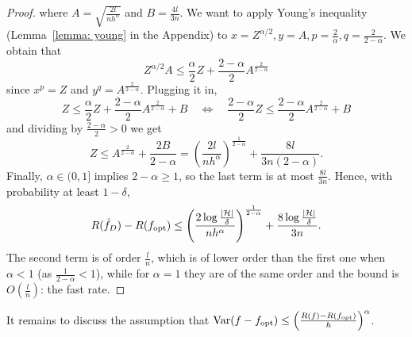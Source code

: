 \documentclass[reqno]{amsart}
\begin{document}
\begin{theorem}
\begin{proof}
        where $A = \sqrt{\frac{2l}{nh^\alpha}}$ and $B = \frac{4l}{3n}$. We want to apply Young's inequality (Lemma~\ref{lemma: young} in the Appendix) to $x = Z^{\alpha/2}, y = A, p = \frac{2}{\alpha}, q = \frac{2}{2-\alpha}$. We obtain that
        \begin{equation}
            Z^{\alpha/2} A \le \frac{\alpha}{2} Z + \frac{2-\alpha}{2} A^{\frac{2}{2-\alpha}}
        \end{equation}
        since $x^p = Z$ and $y^q = A^{\frac{2}{2-\alpha}}$. Plugging it in, 
        \begin{equation}
            Z \le \frac{\alpha}{2} Z + \frac{2-\alpha}{2} A^{\frac{2}{2-\alpha}} + B
            \quad\Longleftrightarrow\quad
            \frac{2-\alpha}{2} Z \le \frac{2-\alpha}{2} A^{\frac{2}{2-\alpha}} + B
        \end{equation}
        and dividing by $\frac{2-\alpha}{2}>0$ we get 
        \begin{equation}
            Z \le A^{\frac{2}{2-\alpha}} + \frac{2B}{2-\alpha}
            = {\left(\frac{2l}{nh^\alpha}\right)}^{\frac{1}{2-\alpha}} + \frac{8l}{3n(2-\alpha)}.
        \end{equation}
        Finally, $\alpha\in(0,1]$ implies $2-\alpha\ge 1$, so the last term is at most $\frac{8l}{3n}$. Hence, with probability at least $1-\delta$, 
        \begin{equation}
            R(\hat f_D) - R(f_\mathrm{opt}) \le {\left(\frac{2\log\frac{\vert\mathcal{H}\vert}{\delta}}{nh^\alpha}\right)}^{\frac{1}{2-\alpha}} + \frac{8\log\frac{\vert\mathcal{H}\vert}{\delta}}{3n}.
        \end{equation}
        The second term is of order $\frac{l}{n}$, which is of lower order than the first one when $\alpha<1$ (as $\frac{1}{2-\alpha}<1$), while for $\alpha=1$ they are of the same order and the bound is $O\left(\frac{l}{n}\right)$: the fast rate.
    \end{proof}
\end{theorem}

It remains to discuss the assumption that $ \operatorname{Var}(f - f_\mathrm{opt}) \le {\left(\frac{R(f)-R(f_\mathrm{opt})}{h}\right)}^\alpha$. 
\end{document}
